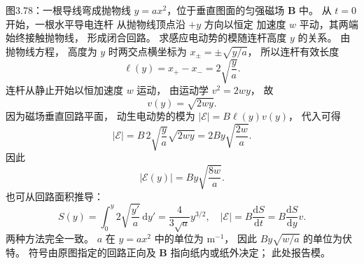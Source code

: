 图3.78：一根导线弯成抛物线
$y=ax^2$，位于垂直图面的匀强磁场
$\bm B$ 中。
从 $t=0$ 开始，一根水平导电连杆
从抛物线顶点沿 $+y$ 方向以恒定
加速度 $w$ 平动，其两端始终接触抛物线，
形成闭合回路。
求感应电动势的模随连杆高度 $y$ 的关系。
\exsolution
由抛物线方程，
高度为 $y$ 时两交点横坐标为
$x_\pm=\pm\sqrt{y/a}$，
所以连杆有效长度
\[
\ell(y)=x_+-x_-=2\sqrt{\frac ya}.
\]
连杆从静止开始以恒加速度 $w$ 运动，
由运动学
$v^2=2wy$，
故
\[
v(y)=\sqrt{2wy}.
\]
因为磁场垂直回路平面，
动生电动势的模为
$|\mathcal E|=B\ell(y)v(y)$，
代入可得
\[
|\mathcal E|=
B\,2\sqrt{\frac ya}\sqrt{2wy}
=2By\sqrt{\frac{2w}{a}}.
\]
因此
\[
\boxed{|\mathcal E(y)|=
By\sqrt{\frac{8w}{a}}}.
\]
也可从回路面积推导：
\[
S(y)=\int_0^y
2\sqrt{\frac{y'}a}\,\mathrm dy'
=\frac4{3\sqrt a}y^{3/2},
\quad
|\mathcal E|=B\frac{\mathrm dS}{\mathrm dt}
=B\frac{\mathrm dS}{\mathrm dy}v.
\]
两种方法完全一致。
\excheck $a$ 在 $y=ax^2$ 中的单位为
$\mathrm{m^{-1}}$，
因此
$By\sqrt{w/a}$ 的单位为伏特。
符号由原图指定的回路正向及
$\bm B$ 指向纸内或纸外决定；
此处报告模。
